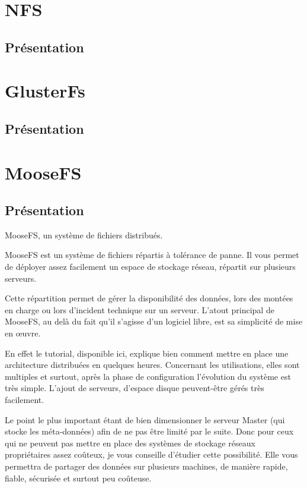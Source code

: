 \documentclass[12pt]{report}
\begin{document}
	\chapter{NFS}
		\section{Présentation}

	\chapter{GlusterFs}
		\section{Présentation}

	\chapter{MooseFS}
		\section{Présentation}
    
		MooseFS, un système de fichiers distribués.
		
		MooseFS est un système de fichiers répartis à tolérance de panne. Il vous permet de déployer assez facilement un espace de stockage réseau, répartit sur plusieurs serveurs.
		
		Cette répartition permet de gérer la disponibilité des données, lors des montées en charge ou lors d’incident technique sur un serveur. L’atout principal de MooseFS, au delà du fait qu’il s’agisse d’un logiciel libre, est sa simplicité de mise en œuvre.
		
		En effet le tutorial, disponible ici, explique bien comment mettre en place une architecture distribuées en quelques heures. Concernant les utilisations, elles sont multiples et surtout, après la phase de configuration l’évolution du système est très simple. L’ajout de serveurs, d’espace disque peuvent-être gérés très facilement.
		
		Le point le plus important étant de bien dimensionner le serveur Master (qui stocke les méta-données) afin de ne pas être limité par le suite. Donc pour ceux qui ne peuvent pas mettre en place des systèmes de stockage réseaux propriétaires assez coûteux, je vous conseille d’étudier cette possibilité. Elle vous permettra de partager des données sur plusieurs machines, de manière rapide, fiable, sécurisée et surtout peu coûteuse.
\end{document}

